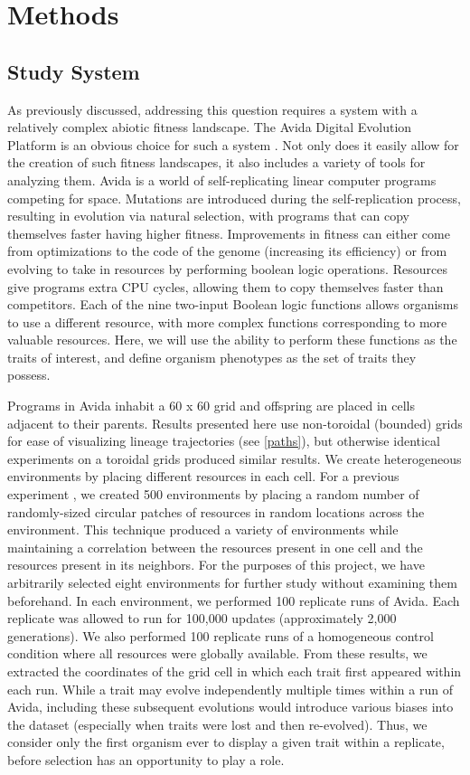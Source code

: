 \section{Methods}

\subsection{Study System}
As previously discussed, addressing this question requires a system with a relatively complex abiotic fitness landscape. The Avida Digital Evolution Platform is an obvious choice for such a system \citep{ofria_avida:_2004}. Not only does it easily allow for the creation of such fitness landscapes, it also includes a variety of tools for analyzing them. Avida is a world of self-replicating linear computer programs competing for space. Mutations are introduced during the self-replication process, resulting in evolution via natural selection, with programs that can copy themselves faster having higher fitness. Improvements in fitness can either come from optimizations to the code of the genome (increasing its efficiency) or from evolving to take in resources by performing boolean logic operations. Resources give programs extra CPU cycles, allowing them to copy themselves faster than competitors. Each of the nine two-input Boolean logic functions allows organisms to use a different resource, with more complex functions corresponding to more valuable resources. Here, we will use the ability to perform these functions as the traits of interest, and define organism phenotypes as the set of traits they possess.

Programs in Avida inhabit a 60 x 60 grid and offspring are placed in cells adjacent to their parents. Results presented here use non-toroidal (bounded) grids for ease of visualizing lineage trajectories (see \ref{paths}), but otherwise identical experiments on a toroidal grids produced similar results.  We create heterogeneous environments by placing different resources in each cell. For a previous experiment \citep{dolson_spatial_2017}, we created 500 environments by placing a random number of randomly-sized circular patches of resources in random locations across the environment. This technique produced a variety of environments while maintaining a correlation between the resources present in one cell and the resources present in its neighbors. For the purposes of this project, we have arbitrarily selected eight environments for further study without examining them beforehand. In each environment, we performed 100 replicate runs of Avida. Each replicate was allowed to run for 100,000 updates (approximately 2,000 generations). We also performed 100 replicate runs of a homogeneous control condition where all resources were globally available. From these results, we extracted the coordinates of the grid cell in which each trait first appeared within each run. While a trait may evolve independently multiple times within a run of Avida, including these subsequent evolutions would introduce various biases into the dataset (especially when traits were lost and then re-evolved). Thus, we consider only the first organism ever to display a given trait within a replicate, before selection has an opportunity to play a role.

